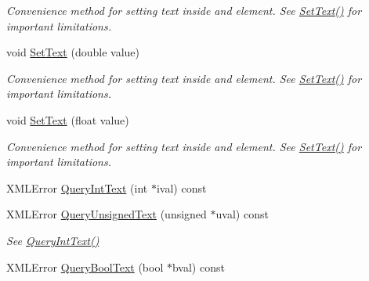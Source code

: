 \begin{DoxyCompactItemize}
\begin{DoxyCompactList}\small\item\em Convenience method for setting text inside and element. See \hyperlink{classtinyxml2_1_1_x_m_l_element_a1f9c2cd61b72af5ae708d37b7ad283ce}{Set\+Text()} for important limitations. \end{DoxyCompactList}\item 
\hypertarget{classtinyxml2_1_1_x_m_l_element_a67bd77ac9aaeff58ff20b4275a65ba4e}{}void \hyperlink{classtinyxml2_1_1_x_m_l_element_a67bd77ac9aaeff58ff20b4275a65ba4e}{Set\+Text} (double value)\label{classtinyxml2_1_1_x_m_l_element_a67bd77ac9aaeff58ff20b4275a65ba4e}

\begin{DoxyCompactList}\small\item\em Convenience method for setting text inside and element. See \hyperlink{classtinyxml2_1_1_x_m_l_element_a1f9c2cd61b72af5ae708d37b7ad283ce}{Set\+Text()} for important limitations. \end{DoxyCompactList}\item 
\hypertarget{classtinyxml2_1_1_x_m_l_element_a51d560da5ae3ad6b75e0ab9ffb2ae42a}{}void \hyperlink{classtinyxml2_1_1_x_m_l_element_a51d560da5ae3ad6b75e0ab9ffb2ae42a}{Set\+Text} (float value)\label{classtinyxml2_1_1_x_m_l_element_a51d560da5ae3ad6b75e0ab9ffb2ae42a}

\begin{DoxyCompactList}\small\item\em Convenience method for setting text inside and element. See \hyperlink{classtinyxml2_1_1_x_m_l_element_a1f9c2cd61b72af5ae708d37b7ad283ce}{Set\+Text()} for important limitations. \end{DoxyCompactList}\item 
X\+M\+L\+Error \hyperlink{classtinyxml2_1_1_x_m_l_element_a71327c9a9d8840562bd204f46d0a7189}{Query\+Int\+Text} (int $\ast$ival) const 
\item 
\hypertarget{classtinyxml2_1_1_x_m_l_element_a2192091dec0c06be8b14f4e912c01758}{}X\+M\+L\+Error \hyperlink{classtinyxml2_1_1_x_m_l_element_a2192091dec0c06be8b14f4e912c01758}{Query\+Unsigned\+Text} (unsigned $\ast$uval) const \label{classtinyxml2_1_1_x_m_l_element_a2192091dec0c06be8b14f4e912c01758}

\begin{DoxyCompactList}\small\item\em See \hyperlink{classtinyxml2_1_1_x_m_l_element_a71327c9a9d8840562bd204f46d0a7189}{Query\+Int\+Text()} \end{DoxyCompactList}\item 
\hypertarget{classtinyxml2_1_1_x_m_l_element_afeb060672fa934163fc573e692b7fe38}{}X\+M\+L\+Error \hyperlink{classtinyxml2_1_1_x_m_l_element_afeb060672fa934163fc573e692b7fe38}{Query\+Bool\+Text} (bool $\ast$bval) const \label{classtinyxml2_1_1_x_m_l_element_afeb060672fa934163fc573e692b7fe38}


\end{DoxyCompactItemize}
